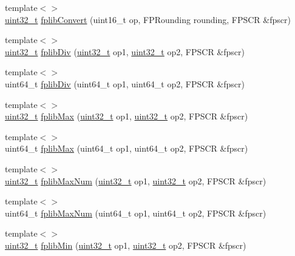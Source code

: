 \begin{DoxyCompactItemize}
\item 
{\footnotesize template$<$$>$ }\\\hyperlink{Type_8hh_a435d1572bf3f880d55459d9805097f62}{uint32\_\-t} \hyperlink{namespaceArmISA_a5d14d713d9f3cfef7dbdb425921e1901}{fplibConvert} (uint16\_\-t op, FPRounding rounding, FPSCR \&fpscr)
\item 
{\footnotesize template$<$$>$ }\\\hyperlink{Type_8hh_a435d1572bf3f880d55459d9805097f62}{uint32\_\-t} \hyperlink{namespaceArmISA_a4a7d5aa817c9203e4833f8b489e53f2c}{fplibDiv} (\hyperlink{Type_8hh_a435d1572bf3f880d55459d9805097f62}{uint32\_\-t} op1, \hyperlink{Type_8hh_a435d1572bf3f880d55459d9805097f62}{uint32\_\-t} op2, FPSCR \&fpscr)
\item 
{\footnotesize template$<$$>$ }\\uint64\_\-t \hyperlink{namespaceArmISA_ad3cc02ce3278c0fe894a6679eec13708}{fplibDiv} (uint64\_\-t op1, uint64\_\-t op2, FPSCR \&fpscr)
\item 
{\footnotesize template$<$$>$ }\\\hyperlink{Type_8hh_a435d1572bf3f880d55459d9805097f62}{uint32\_\-t} \hyperlink{namespaceArmISA_a4eb73ac0de762b9681b3a982015b8772}{fplibMax} (\hyperlink{Type_8hh_a435d1572bf3f880d55459d9805097f62}{uint32\_\-t} op1, \hyperlink{Type_8hh_a435d1572bf3f880d55459d9805097f62}{uint32\_\-t} op2, FPSCR \&fpscr)
\item 
{\footnotesize template$<$$>$ }\\uint64\_\-t \hyperlink{namespaceArmISA_a720c9091d2417c687a7484d5763d5399}{fplibMax} (uint64\_\-t op1, uint64\_\-t op2, FPSCR \&fpscr)
\item 
{\footnotesize template$<$$>$ }\\\hyperlink{Type_8hh_a435d1572bf3f880d55459d9805097f62}{uint32\_\-t} \hyperlink{namespaceArmISA_a9502bd6b59d0aa250036f8798ee5d268}{fplibMaxNum} (\hyperlink{Type_8hh_a435d1572bf3f880d55459d9805097f62}{uint32\_\-t} op1, \hyperlink{Type_8hh_a435d1572bf3f880d55459d9805097f62}{uint32\_\-t} op2, FPSCR \&fpscr)
\item 
{\footnotesize template$<$$>$ }\\uint64\_\-t \hyperlink{namespaceArmISA_acf68e1b0753edbc365983bb151397dbd}{fplibMaxNum} (uint64\_\-t op1, uint64\_\-t op2, FPSCR \&fpscr)
\item 
{\footnotesize template$<$$>$ }\\\hyperlink{Type_8hh_a435d1572bf3f880d55459d9805097f62}{uint32\_\-t} \hyperlink{namespaceArmISA_aaff91a9ef684a2fbae263d7e28bb47a3}{fplibMin} (\hyperlink{Type_8hh_a435d1572bf3f880d55459d9805097f62}{uint32\_\-t} op1, \hyperlink{Type_8hh_a435d1572bf3f880d55459d9805097f62}{uint32\_\-t} op2, FPSCR \&fpscr)

\end{DoxyCompactItemize}
